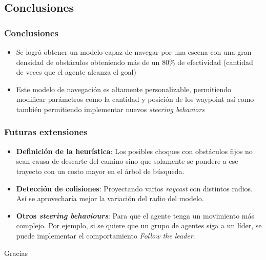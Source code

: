 \documentclass[hyperref={pdfpagelayout=SinglePage}]{beamer}
\begin{document}
\subsection{Conclusiones}

\begin{frame}
\frametitle{Conclusiones}
\begin{itemize}
\item Se logró obtener un modelo capaz de navegar por una escena con una gran densidad de obstáculos obteniendo más de un 80\% de efectividad (cantidad de veces que el agente alcanza el goal)
\item Este modelo de navegación es altamente personalizable, permitiendo modificar parámetros como la cantidad y posición de los waypoint así como también permitiendo implementar nuevos \textit{steering behaviors}
\end{itemize}	
\end{frame} 

\begin{frame}
\frametitle{Futuras extensiones}
\begin{itemize}
\item \textbf{Definición de la heurística}: Los posibles choques con obstáculos fijos no sean causa de descarte del camino sino que solamente se pondere a ese trayecto con un costo mayor en el árbol de búsqueda.
\item \textbf{Detección de colisiones}: Proyectando varios \textit{raycast} con distintos radios. Así se aprovecharía mejor la variación del radio del modelo.
\item \textbf{Otros \textit{steering behaviours}}: Para que el agente tenga un movimiento más complejo. Por ejemplo, si se quiere que un grupo de agentes siga a un líder, se puede implementar el comportamiento \textit{Follow the leader}. 

\end{itemize}	
\end{frame} 

\begin{frame}[plain]
    \centering
	\Huge Gracias
\end{frame}
\end{document}
